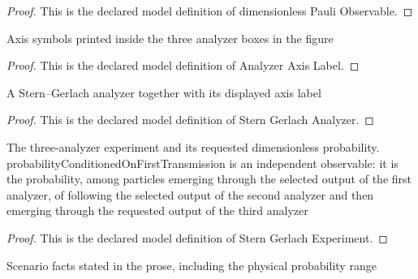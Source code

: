 \begin{proof}
  This is the declared model definition of dimensionless Pauli Observable.
\end{proof}
\begin{definition}
  \label{def:physics:phyx-mini-0542:phyxminiproblems-problemphyxmini0542-analyzeraxislabel}
  Axis symbols printed inside the three analyzer boxes in the figure
\end{definition}
\begin{proof}
  This is the declared model definition of Analyzer Axis Label.
\end{proof}
\begin{definition}
  \label{def:physics:phyx-mini-0542:phyxminiproblems-problemphyxmini0542-sterngerlachanalyzer}
  A Stern–Gerlach analyzer together with its displayed axis label
\end{definition}
\begin{proof}
  This is the declared model definition of Stern Gerlach Analyzer.
\end{proof}
\begin{definition}
  \label{def:physics:phyx-mini-0542:phyxminiproblems-problemphyxmini0542-sterngerlachexperiment}
  The three-analyzer experiment and its requested dimensionless probability. probabilityConditionedOnFirstTransmission is an independent observable: it is the probability, among particles emerging through the selected output of the first analyzer, of following the selected output of the second analyzer and then emerging through the requested output of the third analyzer
\end{definition}
\begin{proof}
  This is the declared model definition of Stern Gerlach Experiment.
\end{proof}
\begin{definition}
  \label{def:physics:phyx-mini-0542:phyxminiproblems-problemphyxmini0542-matchesspinhalfscenario}
  Scenario facts stated in the prose, including the physical probability range
\end{definition}
